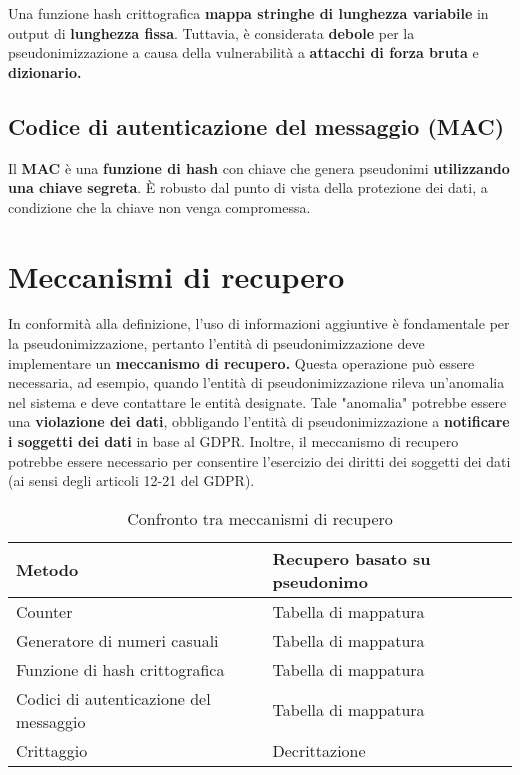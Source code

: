 Una funzione hash crittografica\textbf{ mappa stringhe di lunghezza variabile} in output di \textbf{lunghezza fissa}. Tuttavia, è considerata\textbf{ debole }per la pseudonimizzazione a causa della vulnerabilità a \textbf{attacchi di forza bruta} e \textbf{dizionario.}

\subsection{Codice di autenticazione del messaggio (MAC)}

Il \textbf{MAC} è una \textbf{funzione di hash} con chiave che genera pseudonimi \textbf{utilizzando una chiave segreta}. È robusto dal punto di vista della protezione dei dati, a condizione che la chiave non venga compromessa.

\section{Meccanismi di recupero}

In conformità alla definizione, l'uso di informazioni aggiuntive è fondamentale per la pseudonimizzazione, pertanto l'entità di pseudonimizzazione deve implementare un \textbf{meccanismo di recupero.}
Questa operazione può essere necessaria, ad esempio, quando l'entità di pseudonimizzazione rileva un'anomalia nel sistema e deve contattare le entità designate. Tale "anomalia" potrebbe essere una \textbf{violazione dei dati}, obbligando l'entità di pseudonimizzazione a \textbf{notificare i soggetti dei dati} in base al GDPR. Inoltre, il meccanismo di recupero potrebbe essere necessario per consentire l'esercizio dei diritti dei soggetti dei dati (ai sensi degli articoli 12-21 del GDPR).

\begin{table}[ht]
\centering
\begin{tabular}{|l|l|}
\hline
\textbf{Metodo}              & \textbf{Recupero basato su pseudonimo} \\ \hline
Counter                      & Tabella di mappatura                  \\ \hline
Generatore di numeri casuali & Tabella di mappatura                  \\ \hline
Funzione di hash crittografica  & Tabella di mappatura                  \\ \hline
Codici di autenticazione del messaggio & Tabella di mappatura                  \\ \hline
Crittaggio                   & Decrittazione                         \\ \hline
\end{tabular}
\caption{Confronto tra meccanismi di recupero}
\end{table}


